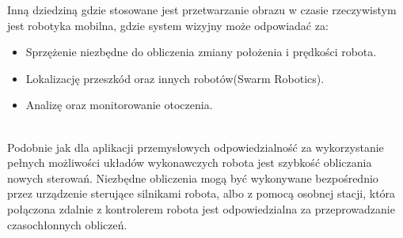 \documentclass[document.tex]{subfiles}
\begin{document}
\indent Inną dziedziną gdzie stosowane jest przetwarzanie obrazu w czasie rzeczywistym
jest robotyka mobilna, gdzie system wizyjny może odpowiadać za:
\begin{itemize}
	\item Sprzężenie niezbędne do obliczenia zmiany położenia i prędkości robota.
	\item Lokalizację przeszkód oraz innych robotów(Swarm Robotics).
	\item Analizę oraz monitorowanie otoczenia.
\end{itemize}
\cite{Mazurek_Robot_Viterbi}\cite{Mobile_Robot_Dumbare}
\\
\indent Podobnie jak dla aplikacji przemysłowych odpowiedzialność za wykorzystanie
pełnych możliwości układów wykonawczych robota jest szybkość obliczania nowych
sterowań. Niezbędne obliczenia mogą być wykonywane bezpośrednio przez urządzenie
sterujące silnikami robota, albo z pomocą osobnej stacji, która połączona zdalnie
z kontrolerem robota jest odpowiedzialna za przeprowadzanie czasochłonnych obliczeń.
\end{document}

